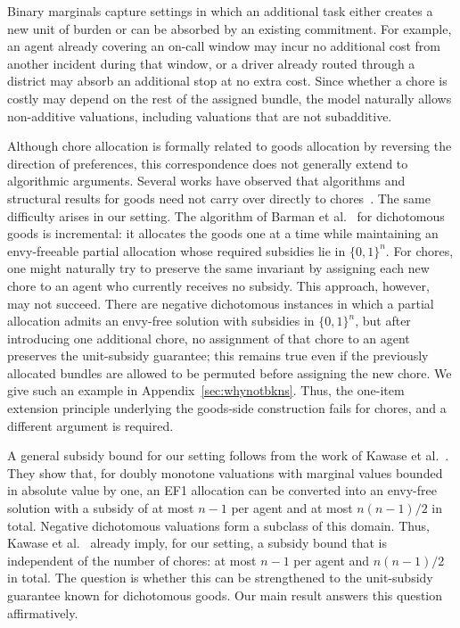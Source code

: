 \documentclass[11pt]{article}
\theoremstyle{plain}
\theoremstyle{plain}
\begin{document}
Binary marginals capture settings in which an additional task either creates a new unit of burden or can be absorbed by an existing commitment. For example, an agent already covering an on-call window may incur no additional cost from another incident during that window, or a driver already routed through a district may absorb an additional stop at no extra cost. Since whether a chore is costly may depend on the rest of the assigned bundle, the model naturally allows non-additive valuations, including valuations that are not subadditive.

Although chore allocation is formally related to goods allocation by reversing the direction of preferences, this correspondence does not generally extend to algorithmic arguments. Several works have observed that algorithms and structural results for goods need not carry over directly to chores~\cite{aziz2017algorithms,sun2023fairness, BSV21}. The same difficulty arises in our setting. The algorithm of Barman et al.~\cite{BKNS22} for dichotomous goods is incremental: it allocates the goods one at a time while maintaining an envy-freeable partial allocation whose required subsidies lie in $\{0,1\}^n$. For chores, one might naturally try to preserve the same invariant by assigning each new chore to an agent who currently receives no subsidy. This approach, however, may not succeed. There are negative dichotomous instances in which a partial allocation admits an envy-free solution with subsidies in $\{0,1\}^n$, but after introducing one additional chore, no assignment of that chore to an agent preserves the unit-subsidy guarantee; this remains true even if the previously allocated bundles are allowed to be permuted before assigning the new chore. We give such an example in Appendix~\ref{sec:whynotbkns}. Thus, the one-item extension principle underlying the goods-side construction fails for chores, and a different argument is required.


A general subsidy bound for our setting follows from the work of Kawase et al.~\cite{kawase2025towards}. They show that, for doubly monotone valuations with marginal values bounded in absolute value by one, an EF1 allocation can be converted into an envy-free solution with a subsidy of at most $n-1$ per agent and at most $n(n-1)/2$ in total. Negative dichotomous valuations form a subclass of this domain. Thus, Kawase et al.~\cite{kawase2025towards} already imply, for our setting, a subsidy bound that is independent of the number of chores: at most $n-1$ per agent and $n(n-1)/2$ in total. The question is whether this can be strengthened to the unit-subsidy guarantee known for dichotomous goods. Our main result answers this question affirmatively.
\end{document}
